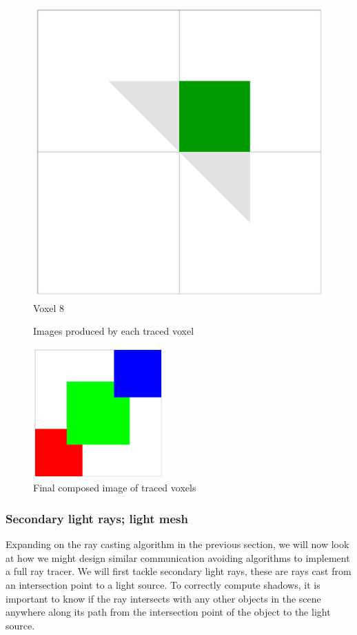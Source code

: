 \begin{figure}[!htb]
  \includegraphics[width=\linewidth]{drawings/cubes_08.pdf}
  Voxel 8
\endminipage
\caption{Images produced by each traced voxel}
\label{fig:cubes}
\end{figure}

\begin{figure}[!htb]
\centering
  \includegraphics[height=5cm]{drawings/cube_final.pdf}
\caption{Final composed image of traced voxels}
\label{fig:cubes_final}
\end{figure}


\subsubsection{Secondary light rays; light mesh}
Expanding on the ray casting algorithm in the previous section, we will now look
at how we might design similar communication avoiding algorithms to implement a 
full ray tracer.  We will first tackle secondary light rays, these are rays cast
from an intersection point to a light source.  To correctly compute shadows, it 
is important to know if the ray intersects with any other objects in the scene 
anywhere along its path from the intersection point of the object to the light 
source.  

